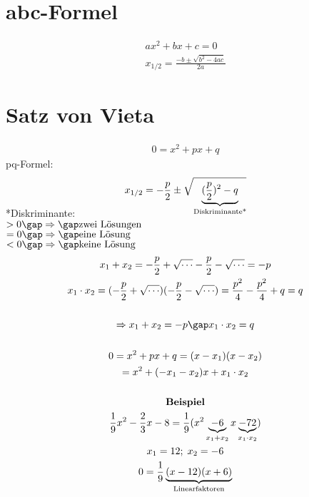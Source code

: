 \section{abc-Formel}
\begin{gather*}
  ax^2 + bx + c = 0 \\
  x_{1/2} = \frac{-b \pm \sqrt{b^2 - 4ac}}{2a}
\end{gather*}
\section{Satz von Vieta}
\begin{gather*}
  0 = x^2 + px + q
\end{gather*}
pq-Formel:
\begin{gather*}
  x_{1/2} = -\frac{p}{2} \pm \sqrt{\smash[b]{\underbrace{(\frac{p}{2})^2 - q}_{\text{Diskriminante*}}}}
\end{gather*}
*Diskriminante:\\
$ > 0 \gap\Rightarrow\gap \text{zwei Lösungen} $ \\
$ = 0 \gap\Rightarrow\gap \text{eine Lösung} $ \\
$ < 0 \gap\Rightarrow\gap \text{keine Lösung} $
\begin{gather*}
  x_1 + x_2 = -\frac{p}{2} + \sqrt{\cdots} - \frac{p}{2} - \sqrt{\cdots} = -p \\
  x_1 \cdot x_2 = (-\frac{p}{2} + \sqrt{\cdots}) (-\frac{p}{2} - \sqrt{\cdots}) = \frac{p^2}{4} - \frac{p^2}{4} + q = q \\\\
  \Rightarrow x_1 + x_2 = -p \gap x_1 \cdot x_2 = q \\\\
  0 = x^2 + px + q = (x - x_1)(x - x_2) \\
  = x^2 + (-x_1 - x_2)x + x_1 \cdot x_2 \\\\
  \textbf{Beispiel} \\
  \frac{1}{9}x^2 - \frac{2}{3}x - 8 = \frac{1}{9} (x^2 \underbrace{-6}_{x_1 + x_2}x \underbrace{-72}_{x_1 \cdot x_2}) \\
  x_1 = 12; \; x_2 = -6 \\
  0 = \frac{1}{9} \underbrace{(x - 12)(x + 6)}_{\text{Linearfaktoren}}
\end{gather*}
